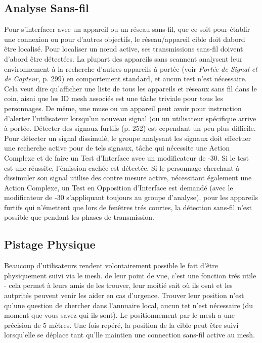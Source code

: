 \subsection{Analyse Sans-fil} 

Pour s'interfacer avec un appareil ou un réseau sans-fil, que ce soit pour établir une connexion ou pour d'autres objectifs, le réseau/appareil cible doit dabord être localisé. Pour localiser un nœud active, ses transmissions sans-fil doivent d'abord être détectées. La plupart des appareils sans scannent analysent leur environnement à la recherche d'autres appareils à portée (voir \textit{Portée de Signal et de Capteur,} p. 299) en comportement standard, et aucun test n'est nécessaire. Cela veut dire qu'afficher une liste de tous les appareils et réseaux sans fil dans le coin, aisni que les ID mesh associés est une tâche triviale pour tous les personnages. De même, une muse ou un appareil peut avoir pour instruction d'alerter l'utilisateur lorsqu'un nouveau signal (ou un utilisateur spécifique arrive à portée. Détecter des signaux furtifs (p. 252) est cependant un peu plus difficile. Pour détecter un signal dissimulé, le groupe analysant les signaux doit effectuer une recherche active pour de tels signaux, tâche qui nécessite une Action Complexe et de faire un Test d'Interface avec un modificateur de -30. Si le test est une réussite, l'émission cachée est détectée. Si le personnage cherchant à dissimuler son signal utilise des contre mesure active, nécessitant également une Action Complexe, un Test en Opposition d'Interface est demandé (avec le modificateur de -30 s'appliquant toujours au groupe d'analyse). pour les appareils furtifs qui n'émettent que lors de fenêtres trés courtes, la détection sans-fil n'est possible que pendant les phases de transmission. 

\subsection{Pistage Physique} 

Beaucoup d'utilisateurs rendent volontairement possible le fait d'être physiquement suivi via le mesh. de leur point de vue, c'est une fonction trés utile - cela permet à leurs amis de les trouver, leur moitié sait où ils osnt et les autprités peuvent venir les aider en cas d'urgence. Trouver leur position n'est qu'une question de chercher dans l'annuaire local, aucun tet n'est nécessaire (du moment que vous savez qui ils sont). Le positionnement par le mesh a une précision de 5 mètres. Une fois repéré, la position de la cible peut être suivi lorsqu'elle se déplace tant qu'lle maintien une connection sans-fil active au mesh. 

